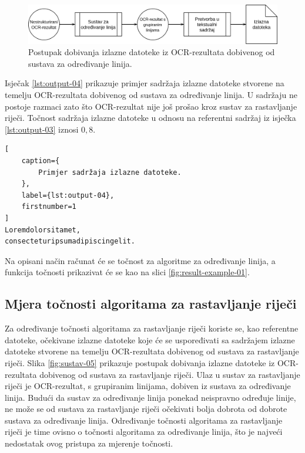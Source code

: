 \documentclass[times, utf8, zavrsni]{fer}
\begin{document}
\begin{figure}[htb]
    \centering
    \captionsetup{justification=centering,margin=2cm}
    \includegraphics[width=\textwidth]{images/sustav-04.png}
    \caption{
        Postupak dobivanja izlazne datoteke iz OCR-rezultata dobivenog od
        sustava za određivanje linija.
    }
    \label{fig:sustav-04}
\end{figure}

\pagebreak

Isječak \ref{lst:output-04} prikazuje primjer sadržaja izlazne datoteke stvorene
na temelju OCR-rezultata dobivenog od sustava za određivanje linija. U sadržaju
ne postoje razmaci zato što OCR-rezultat nije još prošao kroz
sustav za rastavljanje riječi. Točnost sadržaja izlazne datoteke u odnosu na
referentni sadržaj iz isječka \ref{lst:output-03} iznosi $0{,}8$.

\begin{lstlisting}[
    caption={
        Primjer sadržaja izlazne datoteke.
    },
    label={lst:output-04},
    firstnumber=1
]
Loremdolorsitamet,
consecteturipsumadipiscingelit.
\end{lstlisting}

Na opisani način računat će se točnost za algoritme za određivanje linija, a
funkcija točnosti prikazivat će se kao na slici \ref{fig:result-example-01}.




\subsection{Mjera točnosti algoritama za rastavljanje riječi}
Za određivanje točnosti algoritama za rastavljanje riječi koriste se, kao
referentne datoteke, očekivane izlazne datoteke koje će se uspoređivati sa
sadržajem izlazne datoteke stvorene na temelju OCR-rezultata dobivenog od
sustava za rastavljanje riječi. Slika \ref{fig:sustav-05} prikazuje postupak
dobivanja izlazne datoteke iz OCR-rezultata dobivenog od sustava za
rastavljanje riječi. Ulaz u sustav za rastavljanje riječi je OCR-rezultat, s
grupiranim linijama, dobiven iz sustava za određivanje linija. Budući da sustav
za određivanje linija ponekad neispravno određuje linije, ne može se od sustava
za rastavljanje riječi očekivati bolja dobrota od dobrote sustava za
određivanje linija. Određivanje točnosti algoritama za rastavljanje riječi je
time ovisno o točnosti algoritama za određivanje linija, što je najveći
nedostatak ovog pristupa za mjerenje točnosti.
\end{document}
